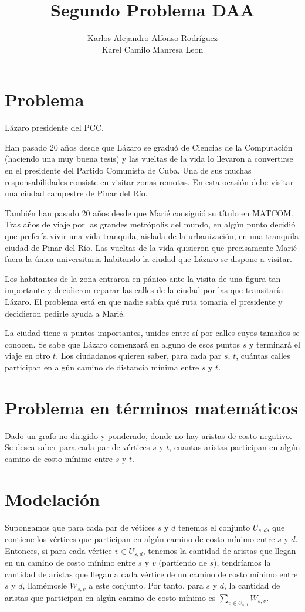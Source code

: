 \documentclass{article}
\begin{document}
\title{Segundo Problema DAA}
\author{Karlos Alejandro Alfonso Rodríguez \\ Karel Camilo Manresa Leon}
\maketitle
\newpage
\section*{Problema}
Lázaro presidente del PCC.

Han pasado 20 años desde que Lázaro se graduó de Ciencias de la Computación 
(haciendo una muy buena tesis) y las vueltas de la vida lo llevaron a convertirse en 
el presidente del Partido Comunista de Cuba. Una de sus muchas responsabilidades 
consiste en visitar zonas remotas. En esta ocasión debe visitar una ciudad campestre 
de Pinar del Río.

También han pasado 20 años desde que Marié consiguió su título en MATCOM. 
Tras años de viaje por las grandes metrópolis del mundo, en algún punto decidió 
que prefería vivir una vida tranquila, aislada de la urbanización, en una tranquila 
ciudad de Pinar del Río. Las vueltas de la vida quisieron que precisamente Marié fuera 
la única universitaria habitando la ciudad que Lázaro se dispone a visitar.

Los habitantes de la zona entraron en pánico ante la visita de una figura tan importante 
y decidieron reparar las calles de la ciudad por las que transitaría Lázaro. 
El problema está en que nadie sabía qué ruta tomaría el presidente y decidieron 
pedirle ayuda a Marié.

La ciudad tiene $n$ puntos importantes, unidos entre sí por calles cuyos tamaños se conocen. 
Se sabe que Lázaro comenzará en alguno de esos puntos $s$ y terminará el viaje en otro $t$. 
Los ciudadanos quieren saber, para cada par $s$, $t$, cuántas calles participan en algún 
camino de distancia mínima entre $s$ y $t$.

\section*{Problema en términos matemáticos}
Dado un grafo no dirigido y ponderado, donde no hay aristas de costo negativo. Se desea saber 
para cada par de vértices $s$ y $t$, cuantas aristas participan en algún camino de costo mínimo
entre $s$ y $t$.

\section*{Modelación}
Supongamos que para cada par de vétices $s$ y $d$ tenemos el conjunto $U_{s,d}$, que contiene
los vértices que participan en algún camino de costo mínimo entre $s$ y $d$. Entonces, si para cada
vértice $v \in U_{s,d}$, tenemos la cantidad de aristas que llegan en un camino de 
costo mínimo entre $s$ y $v$ (partiendo de $s$), tendríamos la cantidad de aristas que llegan a
cada vértice de un camino de costo mínimo entre $s$ y $d$, llamémosle $W_{s,v}$ a este conjunto. 
Por tanto, para $s$ y $d$, la cantidad de aristas que participan en algún camino de 
costo mínimo es $\sum_{v \in U_{s,d}}W_{s,v}$.
\end{document}
